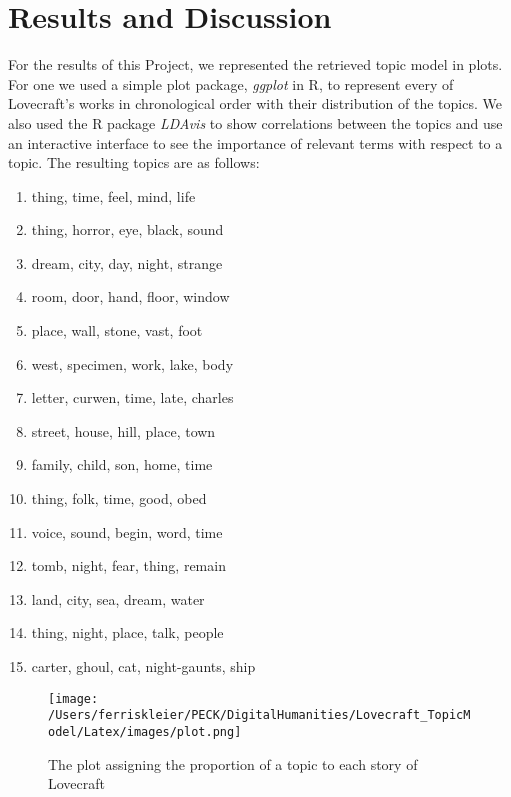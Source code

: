 \section{Results and Discussion}

For the results of this Project, we represented the retrieved topic model in plots. For one we 
used a simple plot package, \textit{ggplot} in R, to represent every of Lovecraft's works in chronological 
order with their distribution of the topics. We also used the R package \textit{LDAvis} to show correlations 
between the topics and use an interactive interface to see the importance of relevant terms with 
respect to a topic. The resulting topics are as follows:

\begin{enumerate}
    \itemsep0em
    \item thing, time, feel, mind, life
    \item thing, horror, eye, black, sound
    \item dream, city, day, night, strange
    \item room, door, hand, floor, window
    \item place, wall, stone, vast, foot
    \item west, specimen, work, lake, body
    \item letter, curwen, time, late, charles
    \item street, house, hill, place, town
    \item family, child, son, home, time
    \item thing, folk, time, good, obed
    \item voice, sound, begin, word, time
    \item tomb, night, fear, thing, remain
    \item land, city, sea, dream, water
    \item thing, night, place, talk, people
    \item carter, ghoul, cat, night-gaunts, ship
\end{enumerate}

\begin{figure}[ht]
    \centering
    \texttt{[image: /Users/ferriskleier/PECK/DigitalHumanities/Lovecraft\_TopicModel/Latex/images/plot.png]}
    \caption{The plot assigning the proportion of a topic to each story of Lovecraft}
    \label{fig:mesh1}
\end{figure}

